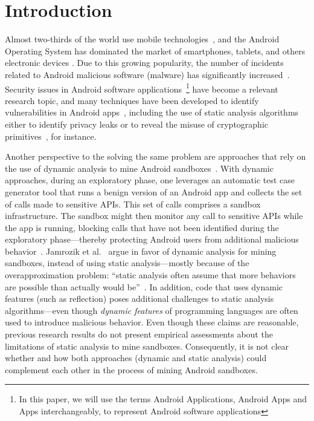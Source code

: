 \section{Introduction}\label{sec:introduction}

Almost two-thirds of the world use mobile technologies~\cite{Comscore}, and the Android Operating System has dominated the market of smartphones, tablets, and others electronic devices \cite{statcounter}. Due to this growing popularity, the number of incidents related to Android malicious software (malware) has significantly increased~\cite{DBLP:journals/comsur/FarukiBLGGCR15,DBLP:journals/csur/SufatrioTCT15}. Security issues in Android software applications~\footnote{In this paper, we will use the terms Android Applications, Android Apps and Apps interchangeably, to represent Android software applications} have become a relevant research topic, and many techniques have been developed to identify vulnerabilities in Android apps~\cite{DBLP:conf/pldi/ArztRFBBKTOM14}, including the use of static analysis algorithms either to identify privacy leaks or to reveal the misuse of cryptographic primitives~\cite{krueger:ecoop-2018,rahaman:ccs-2019}, for instance.

Another perspective to the solving the same problem are approaches that rely on the use of dynamic analysis to mine Android sandboxes~\cite{DBLP:conf/icse/JamrozikSZ16}. With dynamic approaches, during an exploratory phase, one leverages an automatic test case generator tool that runs a benign version of an Android app and collects the set of calls made to sensitive APIs. This set of calls comprises a sandbox infrastructure. The sandbox might then monitor any call to sensitive APIs while the app is running, blocking calls that have not been identified during the exploratory phase---thereby protecting Android users from additional malicious behavior~\cite{DBLP:conf/icse/JamrozikSZ16}.
Jamrozik et al.~\cite{DBLP:conf/icse/JamrozikSZ16} argue in favor of dynamic analysis for mining sandboxes, instead of using static analysis---mostly because of the overapproximation problem: ``static analysis often assume that more behaviors are possible than actually would be''~\cite{DBLP:conf/icse/JamrozikSZ16}. In addition, code that uses dynamic features (such as reflection) poses additional challenges to static analysis algorithms---even though \emph{dynamic features} of programming languages are often used to introduce malicious behavior. Even though these claims are reasonable, previous research results do not present empirical assessments about the limitations of static analysis to mine sandboxes. Consequently, it is not clear whether and how both approaches (dynamic and static analysis) could complement each other in the process of mining Android sandboxes.

